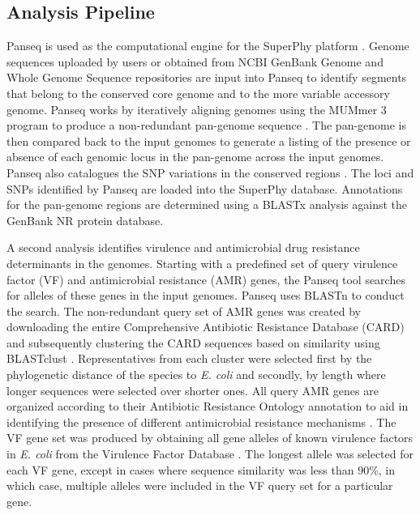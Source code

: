\documentclass[a4paper,twoside]{article}
\begin{document}
{\subsection{Analysis Pipeline}
\label{sec:pipeline}

Panseq is used as the computational engine for the SuperPhy platform \cite{laing_pan-genome_2010}. Genome sequences uploaded by users or obtained from NCBI GenBank Genome and Whole Genome Sequence repositories \cite{benson2013genbank} are input into Panseq to identify segments that belong to the conserved core genome and to the more variable accessory genome. Panseq works by iteratively aligning genomes using the MUMmer 3 program to produce a non-redundant pan-genome sequence \cite{laing_pan-genome_2010,kurtz2004versatile}. The pan-genome is then compared back to the input genomes to generate a listing of the presence or absence of each genomic locus in the pan-genome across the input genomes. Panseq also catalogues the SNP variations in the conserved regions \cite{laing_pan-genome_2010}.  The loci and SNPs identified by Panseq are loaded into the SuperPhy database. Annotations for the pan-genome regions are determined using a BLASTx analysis against the GenBank NR protein database.

A second analysis identifies virulence and antimicrobial drug resistance determinants in the genomes. Starting with a predefined set of query virulence factor (VF) and antimicrobial resistance (AMR) genes, the Panseq tool searches for alleles of these genes in the input genomes. Panseq uses BLASTn to conduct the search. The non-redundant query set of AMR genes was created by downloading the entire Comprehensive Antibiotic Resistance Database (CARD) \cite{mcarthur2012card} and subsequently clustering the CARD sequences based on similarity using BLASTclust \cite{altschul_gapped_1997}. Representatives from each cluster were selected first by the phylogenetic distance of the species to \textit{E. coli} and secondly, by length where longer sequences were selected over shorter ones. All query AMR genes are organized according to their Antibiotic Resistance Ontology annotation to aid in identifying the presence of different antimicrobial resistance mechanisms \cite{antezana_biological_2009}. The VF gene set was produced by obtaining all gene alleles of known virulence factors in \textit{E. coli} from the Virulence Factor Database \cite{chen2012vfdb,chen2005vfdb}.  The longest allele was selected for each VF gene, except in cases where sequence similarity was less than 90\%, in which case, multiple alleles were included in the VF query set for a particular gene.

}
\end{document}
